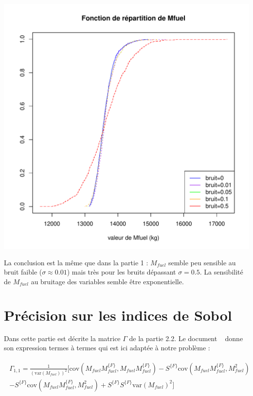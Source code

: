 \documentclass{book}
\begin{document}
\begin{center}
\includegraphics[scale=0.7]{M_fctrep_bruit.pdf}
\end{center}
La conclusion est la même que dans la partie 1 : $M_{fuel}$ semble peu sensible au bruit faible ($\sigma\approx 0.01$) mais très pour les bruits dépassant $\sigma=0.5$. La sensibilité de $M_{fuel}$ au bruitage des variables semble être exponentielle.
    
\chapter{Précision sur les indices de Sobol}  
Dans cette partie est décrite la matrice $\Gamma$ de la partie 2.2. Le document ~\cite{ref2} donne son expression termes à termes qui est ici adaptée à notre problème :


\begin{align*}
\begin{split}
\Gamma_{1,1} = \frac{1}{(\text{var}(M_{fuel}))^2}[\text{cov}(M_{fuel}M_{fuel}^{\{F\}},M_{fuel}M_{fuel}^{\{F\}}) - S^{\{F\}}\text{cov}(M_{fuel}M_{fuel}^{\{F\}},M_{fuel}^2) \\
- S^{\{F\}}\text{cov}(M_{fuel}M_{fuel}^{\{F\}},M_{fuel}^2) + S^{\{F\}}S^{\{F\}}\text{var}(M_{fuel})^2]
\end{split}
\end{align*}
\end{document}
